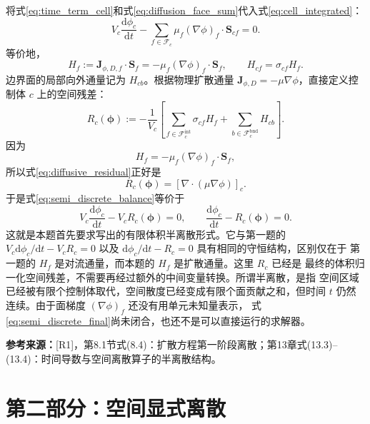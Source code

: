 \documentclass[UTF8,12pt,a4paper]{ctexart}
\numberwithin{equation}{section}
\newcommand{\Rone}{\textnormal{[R1]}}
\newcommand{\source}[1]{%
  \par\smallskip
  \noindent\colorbox{sourcebg}{%
    \parbox{0.955\linewidth}{\raggedright\footnotesize\color{sourcegray}\textbf{参考来源：}#1}%
  }
  \par\smallskip
}
\newcommand{\Sf}{\bm S}
\begin{document}
将式\eqref{eq:time_term_cell}和式\eqref{eq:diffusion_face_sum}代入式\eqref{eq:cell_integrated}：
\begin{equation}
  V_c\frac{\mathrm d\phi_c}{\mathrm dt}
  -\sum_{f\in\mathcal F_c}
  \mu_f(\nabla\phi)_f\cdot\Sf_{cf}=0.
  \label{eq:semi_discrete_balance}
\end{equation}
等价地，
\begin{equation}
  \boxed{
  H_f:=\bm J_{\phi,D,f}\cdot\Sf_f
  =-\mu_f(\nabla\phi)_f\cdot\Sf_f,
  \qquad
  H_{cf}=\sigma_{cf}H_f}.
  \label{eq:diffusive_numerical_flux}
\end{equation}
边界面的局部向外通量记为 $H_{cb}$。根据物理扩散通量
$\bm J_{\phi,D}=-\mu\nabla\phi$，直接定义控制体 $c$ 上的空间残差：
\begin{equation}
  \boxed{
  R_c(\bm\phi)
  :=
  -\frac{1}{V_c}
  \left[
  \sum_{f\in\mathcal F_c^{\mathrm{int}}}\sigma_{cf}H_f
  +
  \sum_{b\in\mathcal F_c^{\mathrm{bnd}}}H_{cb}
  \right]}.
  \label{eq:diffusive_residual}
\end{equation}
因为
\begin{equation}
  H_f=-\mu_f(\nabla\phi)_f\cdot\Sf_f,
\end{equation}
所以式\eqref{eq:diffusive_residual}正好是
\begin{equation}
  \boxed{
  R_c(\bm\phi)
  =
  \left[\nabla\cdot(\mu\nabla\phi)\right]_c.}
  \label{eq:diffusive_residual_laplacian}
\end{equation}
于是式\eqref{eq:semi_discrete_balance}等价于
\begin{equation}
  \boxed{
  V_c\frac{\mathrm d\phi_c}{\mathrm dt}
  -V_cR_c(\bm\phi)=0,
  \qquad
  \frac{\mathrm d\phi_c}{\mathrm dt}
  -R_c(\bm\phi)=0}.
  \label{eq:semi_discrete_final}
\end{equation}
这就是本题首先要求写出的有限体积半离散形式。它与第一题的
$V_c\mathrm d\phi_c/\mathrm dt-V_cR_c=0$ 以及
$\mathrm d\phi_c/\mathrm dt-R_c=0$ 具有相同的守恒结构，区别仅在于
第一题的 $H_f$ 是对流通量，而本题的 $H_f$ 是扩散通量。这里 $R_c$ 已经是
最终的体积归一化空间残差，不需要再经过额外的中间变量转换。所谓半离散，是指
空间区域已经被有限个控制体取代，空间散度已经变成有限个面贡献之和，但时间
$t$ 仍然连续。由于面梯度 $(\nabla\phi)_f$ 还没有用单元未知量表示，
式\eqref{eq:semi_discrete_final}尚未闭合，也还不是可以直接运行的求解器。

\source{\Rone，第8.1节式(8.4)：扩散方程第一阶段离散；第13章式(13.3)--(13.4)：时间导数与空间离散算子的半离散结构。}

\newpage
\section{第二部分：空间显式离散}
\end{document}
